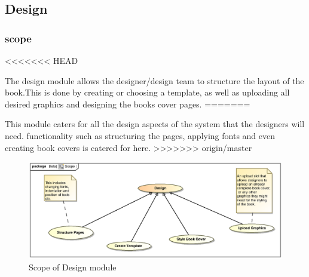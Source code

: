 \clearpage
\subsection{Design}

\subsubsection{scope}
<<<<<<< HEAD
\par{The design module allows the designer/design team to structure the layout of the book.This is done by creating or choosing a template, as well as uploading all desired graphics and designing the books cover pages.}
=======
\par{This module caters for all the design aspects of the system that the designers will need. functionality such as structuring the pages, applying fonts and even creating book covers is catered for here.}
>>>>>>> origin/master

\begin{figure}[h]
\includegraphics[scale=0.9,width=450px]{epsImages/Design/Scope.eps}
\centering
\caption{Scope of Design module}
\end{figure}

\newpage
